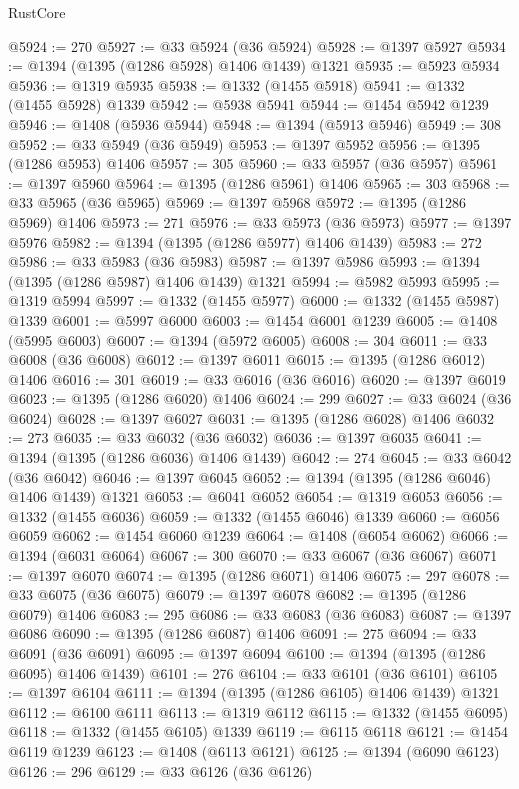 \begin{lexlean}{RustCore}
\begin{coremodule}
@5924 := 270
@5927 := @33 @5924 (@36 @5924)
@5928 := @1397 @5927
@5934 := @1394 (@1395 (@1286 @5928) @1406 @1439) @1321
@5935 := @5923 @5934
@5936 := @1319 @5935
@5938 := @1332 (@1455 @5918)
@5941 := @1332 (@1455 @5928) @1339
@5942 := @5938 @5941
@5944 := @1454 @5942 @1239
@5946 := @1408 (@5936 @5944)
@5948 := @1394 (@5913 @5946)
@5949 := 308
@5952 := @33 @5949 (@36 @5949)
@5953 := @1397 @5952
@5956 := @1395 (@1286 @5953) @1406
@5957 := 305
@5960 := @33 @5957 (@36 @5957)
@5961 := @1397 @5960
@5964 := @1395 (@1286 @5961) @1406
@5965 := 303
@5968 := @33 @5965 (@36 @5965)
@5969 := @1397 @5968
@5972 := @1395 (@1286 @5969) @1406
@5973 := 271
@5976 := @33 @5973 (@36 @5973)
@5977 := @1397 @5976
@5982 := @1394 (@1395 (@1286 @5977) @1406 @1439)
@5983 := 272
@5986 := @33 @5983 (@36 @5983)
@5987 := @1397 @5986
@5993 := @1394 (@1395 (@1286 @5987) @1406 @1439) @1321
@5994 := @5982 @5993
@5995 := @1319 @5994
@5997 := @1332 (@1455 @5977)
@6000 := @1332 (@1455 @5987) @1339
@6001 := @5997 @6000
@6003 := @1454 @6001 @1239
@6005 := @1408 (@5995 @6003)
@6007 := @1394 (@5972 @6005)
@6008 := 304
@6011 := @33 @6008 (@36 @6008)
@6012 := @1397 @6011
@6015 := @1395 (@1286 @6012) @1406
@6016 := 301
@6019 := @33 @6016 (@36 @6016)
@6020 := @1397 @6019
@6023 := @1395 (@1286 @6020) @1406
@6024 := 299
@6027 := @33 @6024 (@36 @6024)
@6028 := @1397 @6027
@6031 := @1395 (@1286 @6028) @1406
@6032 := 273
@6035 := @33 @6032 (@36 @6032)
@6036 := @1397 @6035
@6041 := @1394 (@1395 (@1286 @6036) @1406 @1439)
@6042 := 274
@6045 := @33 @6042 (@36 @6042)
@6046 := @1397 @6045
@6052 := @1394 (@1395 (@1286 @6046) @1406 @1439) @1321
@6053 := @6041 @6052
@6054 := @1319 @6053
@6056 := @1332 (@1455 @6036)
@6059 := @1332 (@1455 @6046) @1339
@6060 := @6056 @6059
@6062 := @1454 @6060 @1239
@6064 := @1408 (@6054 @6062)
@6066 := @1394 (@6031 @6064)
@6067 := 300
@6070 := @33 @6067 (@36 @6067)
@6071 := @1397 @6070
@6074 := @1395 (@1286 @6071) @1406
@6075 := 297
@6078 := @33 @6075 (@36 @6075)
@6079 := @1397 @6078
@6082 := @1395 (@1286 @6079) @1406
@6083 := 295
@6086 := @33 @6083 (@36 @6083)
@6087 := @1397 @6086
@6090 := @1395 (@1286 @6087) @1406
@6091 := 275
@6094 := @33 @6091 (@36 @6091)
@6095 := @1397 @6094
@6100 := @1394 (@1395 (@1286 @6095) @1406 @1439)
@6101 := 276
@6104 := @33 @6101 (@36 @6101)
@6105 := @1397 @6104
@6111 := @1394 (@1395 (@1286 @6105) @1406 @1439) @1321
@6112 := @6100 @6111
@6113 := @1319 @6112
@6115 := @1332 (@1455 @6095)
@6118 := @1332 (@1455 @6105) @1339
@6119 := @6115 @6118
@6121 := @1454 @6119 @1239
@6123 := @1408 (@6113 @6121)
@6125 := @1394 (@6090 @6123)
@6126 := 296
@6129 := @33 @6126 (@36 @6126)

\end{coremodule}
\end{lexlean}
